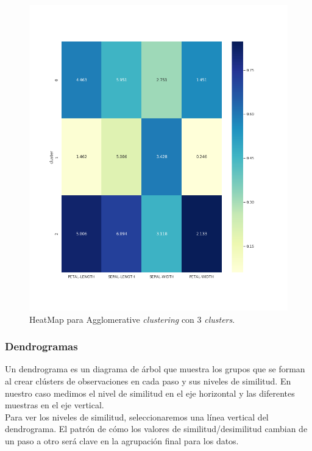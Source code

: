 \documentclass[a4paper, 20pt]{article}
\begin{document}
{\begin{figure}[h]
\centering
\includegraphics[scale=0.63]{dani/heatmapAggClusterIRIS.png}
\caption{HeatMap para Agglomerative \textit{clustering} con 3 \textit{clusters}.}
\label{hmac}
\end{figure}

\clearpage

\subsubsection{Dendrogramas}

Un dendrograma es un diagrama de árbol que muestra los grupos que se forman al crear clústers de observaciones en cada paso y sus niveles de similitud. En nuestro caso medimos el nivel de similitud en el eje horizontal y las diferentes muestras en el eje vertical.\\

Para ver los niveles de similitud, seleccionaremos una línea vertical del dendrograma. El patrón de cómo los valores de similitud/desimilitud cambian de un paso a otro será clave en la agrupación final para los datos.\\

}
\end{document}

